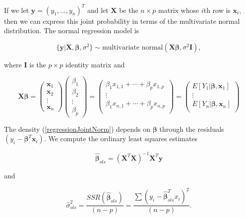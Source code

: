 \documentclass[12pt, a4paper]{article}
\begin{document}
\noindent If we let $\mathbf{y}=(y_1,...,y_n)^T$ and let $\mathbf{X}$ be the $n \times p$ matrix whose $i$th row is $\mathbf{x}_i$, then we can express this joint probability in terms of the multivariate normal distribution.  The normal regression model is

$$\{\mathbf{y}|\mathbf{X},\boldsymbol\beta,\sigma^2\} \sim \text{multivariate normal}\left(\mathbf{X}\boldsymbol\beta,\sigma^2\mathbf{I}\right),$$

where $\mathbf{I}$ is the $p \times p$ identity matrix and

\begin{equation*}
    \mathbf{X}\boldsymbol\beta =
    \begin{pmatrix}
        \mathbf{x}_1 \\
        \mathbf{x}_2 \\
        \vdots  \\
        \mathbf{x}_n
    \end{pmatrix}
    \begin{pmatrix}
        \beta_1 \\
        \beta_2 \\
        \vdots \\
        \beta_p
    \end{pmatrix}
    =
    \begin{pmatrix}
        \beta_1 x_{1,1} + \cdots + \beta_p x_{1,p} \\
        \vdots \\
        \beta_1 x_{n,1} + \cdots + \beta_p x_{n,p} \\
    \end{pmatrix}
    =
    \begin{pmatrix}
        E\left[Y_1|\mathbf{\boldsymbol\beta},\mathbf{x}_1\right] \\
        \vdots \\
        E\left[Y_n|\mathbf{\boldsymbol\beta},\mathbf{x}_n\right] \\
    \end{pmatrix}
\end{equation*}

The density (\ref{regressionJointNorm}) depends on $\boldsymbol\beta$ through the residuals $\left(y_i - \boldsymbol\beta^T\mathbf{x}_i\right)$.  We compute the ordinary least squares estimates

$$\hat{\boldsymbol\beta}_{ols} = \left(\mathbf{X}^T\mathbf{X}\right)^{-1}\mathbf{X}^T\mathbf{y}$$

and

$$\hat{\sigma}^2_{ols} = \frac{SSR\left(\hat{\boldsymbol\beta}_{ols}\right)}{(n-p)} = \frac{\sum\left(y_i - \hat{\boldsymbol\beta}_{ols}^T x_i\right)^2}{(n-p)}.$$
\end{document}
